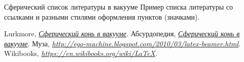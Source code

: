 \documentclass[ignorenonframetext,hyperref={pdftex,unicode}]{beamer}
\begin{document}
\begin{frame}{Сферический список литературы в вакууме}
	Пример списка литературы со ссылками и разными стилями оформления пунктов (значками).
	\begin{thebibliography}{10}
	\beamertemplatebookbibitems
		{\sc Lurkmore}, {\em \href{http://lurkmore.to/\%D0\%A1\%D1\%84\%D0\%B5\%D1\%80\%D0\%B8\%D1\%87\%D0\%B5\%D1\%81\%D0\%BA\%D0\%B8\%D0\%B9_\%D0\%BA\%D0\%BE\%D0\%BD\%D1\%8C_\%D0\%B2_\%D0\%B2\%D0\%B0\%D0\%BA\%D1\%83\%D1\%83\%D0\%BC\%D0\%B5}{Сферический конь в вакууме}}.
	\beamertemplatearticlebibitems
		{\sc Абсурдопедия}, {\em \href{http://absurdopedia.wikia.com/wiki/\%D0\%A1\%D1\%84\%D0\%B5\%D1\%80\%D0\%B8\%D1\%87\%D0\%B5\%D1\%81\%D0\%BA\%D0\%B8\%D0\%B9_\%D0\%BA\%D0\%BE\%D0\%BD\%D1\%8C_\%D0\%B2_\%D0\%B2\%D0\%B0\%D0\%BA\%D1\%83\%D1\%83\%D0\%BC\%D0\%B5}{Сферический конь в вакууме}}.
	\beamertemplateonlinebibitems
		{\sc Муза}, {\em \url{http://ego-machine.blogspot.com/2010/03/latex-beamer.html}}.
	\beamertemplatetextbibitems
		{\sc Wikibooks}, {\em \url{https://en.wikibooks.org/wiki/LaTeX}}.
	\end{thebibliography}
\end{frame}
\end{document}
